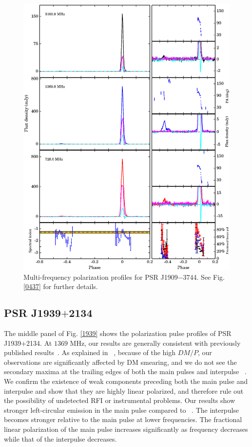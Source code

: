 \documentclass[useAMS,usenatbib]{mn2e}
\begin{document}
\begin{figure}
\begin{center}
\includegraphics[width=6 in]{1909.ps}
\caption{Multi-frequency polarization profiles for PSR J1909$-$3744. 
See Fig. \ref{0437} for further details.}
\label{1909}
\end{center}
\end{figure}

\subsection{PSR J1939$+$2134}

The middle panel of Fig. \ref{1939} shows the polarization pulse profiles of 
PSR J1939$+$2134.
%
At $1369$ MHz, our results are generally consistent with previously published 
results~\citep{Yan11}.
%
As explained in ~\citet{Yan11}, because of the high $DM/P$, our observations 
are significantly affected by DM smearing, and we do not see the secondary 
maxima at the trailing edges of both the main pulses and interpulse
~\citep{Thorsett90,Stairs99,Ord04}.
%
We confirm the existence of weak components preceding both the main pulse 
and interpulse and show that they are highly linear polarized, and therefore 
rule out the possibility of undetected RFI or instrumental problems.
%
Our results show stronger left-circular emission in the main pulse compared 
to ~\citep{Yan11}.
%
The interpulse becomes stronger relative to the main pulse at lower frequencies.
%
The fractional linear polarization of the main pulse increases significantly 
as frequency decreases while that of the interpulse decreases.
\end{document}
